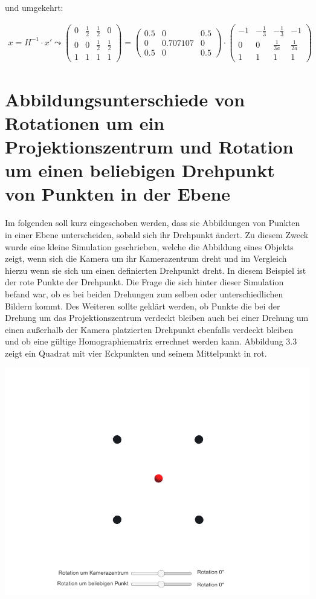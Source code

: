 und umgekehrt:

\begin{gather}
x=H^{-1} \cdot x' \leadsto 
\begin{pmatrix}
0&\frac{1}{2}&\frac{1}{2}&0\\
0&0&\frac{1}{2}&\frac{1}{2}\\
1&1&1&1
\end{pmatrix}
= 	\begin{pmatrix}
0.5&0&0.5\\
0&0.707107&0\\
0.5&0&0.5
\end{pmatrix}
\cdot
\begin{pmatrix}
-1&-\frac{1}{3}&-\frac{1}{3}&-1\\
0&0&\frac{1}{3a}&\frac{1}{2a}\\
1&1&1&1
\end{pmatrix}
\end{gather}

\section{Abbildungsunterschiede von Rotationen um ein Projektionszentrum und Rotation um einen beliebigen Drehpunkt von Punkten in der Ebene}


Im folgenden soll kurz eingeschoben werden, dass sie Abbildungen von Punkten in einer Ebene unterscheiden, sobald sich ihr Drehpunkt ändert. Zu diesem Zweck wurde eine kleine Simulation geschrieben, welche die Abbildung eines Objekts zeigt, wenn sich die Kamera um ihr Kamerazentrum dreht und im Vergleich hierzu wenn sie sich um einen definierten Drehpunkt dreht. In diesem Beispiel ist der rote Punkte der Drehpunkt. Die Frage die sich hinter dieser Simulation befand war, ob es bei beiden Drehungen zum selben oder unterschiedlichen Bildern kommt. Des Weiteren sollte geklärt werden, ob Punkte die bei der Drehung um das Projektionszentrum verdeckt bleiben auch bei einer Drehung um einen außerhalb der Kamera platzierten Drehpunkt ebenfalls verdeckt bleiben und ob eine gültige Homographiematrix errechnet werden kann. Abbildung 3.3 zeigt ein Quadrat mit vier Eckpunkten und seinem Mittelpunkt in rot.

\begin{minipage}{\linewidth}
	\centering
	\includegraphics[width=.8\linewidth]{images/Ausgangslage.png}
\end{minipage}\\


